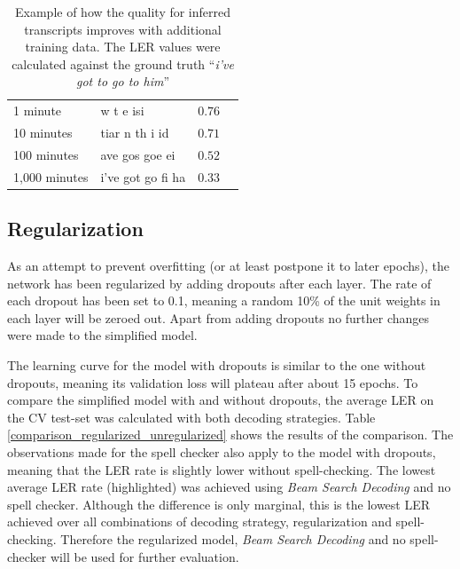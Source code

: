 \begin{table}[!htbp]
	\centering
	\begin{tabular}{llll}
		\toprule
		\thead{training data} & \thead{inferred transcript} & \thead{\ac{LER}} \\
		\midrule
		1 minute & w t e isi & $0.76$  \\ 	
		10 minutes & tiar n th i id & $0.71$  \\ 		
		100 minutes & ave gos goe ei & $0.52$  \\ 		
		1,000 minutes & i've got go fi ha & $0.33$  \\ 		
		\bottomrule
	\end{tabular}
	\caption{Example of how the quality for inferred transcripts improves with additional training data. The \ac{LER} values were calculated against the ground truth \foreignquote{french}{\textit{i've got to go to him}}}
	\label{training_progress}
\end{table}

\subsection{Regularization}
As an attempt to prevent overfitting (or at least postpone it to later epochs), the network has been regularized by adding dropouts after each layer. The rate of each dropout has been set to 0.1, meaning a random 10\% of the unit weights in each layer will be zeroed out. Apart from adding dropouts no further changes were made to the simplified model.

The learning curve for the model with dropouts is similar to the one without dropouts, meaning its validation loss will plateau after about 15 epochs. To compare the simplified model with and without dropouts, the average \ac{LER} on the \ac{CV} test-set was calculated with both decoding strategies. Table \ref{comparison_regularized_unregularized} shows the results of the comparison. The observations made for the spell checker also apply to the model with dropouts, meaning that the \ac{LER} rate is slightly lower without spell-checking. The lowest average \ac{LER} rate (highlighted) was achieved using \textit{Beam Search Decoding} and no spell checker. Although the difference is only marginal, this is the lowest \ac{LER} achieved over all combinations of decoding strategy, regularization and spell-checking. Therefore the regularized model, \textit{Beam Search Decoding} and no spell-checker will be used for further evaluation.

